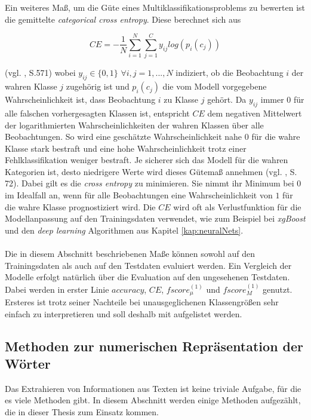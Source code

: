 \documentclass[a4paper,11pt]{article}
\begin{document}
Ein weiteres Maß, um die Güte eines Multiklassifikationsproblems zu bewerten ist die gemittelte \textit{categorical cross entropy}. Diese berechnet sich aus

\[ CE = - \frac{1}{N}\sum_{i=1}^N \sum_{j = 1}^C y_{ij} log(p_i(c_j)) \]

(vgl. \cite{murphy}, S.571) wobei $y_{ij} \in \{0,1\}$ \hspace{0.2cm} $\forall i, j = 1,...,N$ indiziert, ob die Beobachtung $i$ der wahren Klasse $j$ zugehörig ist und $p_i(c_j)$ die vom Modell vorgegebene Wahrscheinlichkeit ist, dass Beobachtung $i$ zu Klasse $j$ gehört. Da $y_{ij}$ immer $0$ für alle falschen vorhergesagten Klassen ist, entspricht $CE$ dem negativen Mittelwert der logarithmierten Wahrscheinlichkeiten der wahren Klassen über alle Beobachtungen. So wird eine geschätzte Wahrscheinlichkeit nahe $0$ für die wahre Klasse stark bestraft und eine hohe Wahrscheinlichkeit trotz einer Fehlklassifikation weniger bestraft. Je sicherer sich das Modell für die wahren Kategorien ist, desto niedrigere Werte wird dieses Gütemaß annehmen (vgl. \cite{proMachine}, S. 72). 
Dabei gilt es die \textit{cross entropy} zu minimieren. Sie nimmt ihr Minimum bei $0$ im Idealfall an, wenn für alle Beobachtungen eine Wahrscheinlichkeit von $1$ für die wahre Klasse prognostiziert wird. Die $CE$ wird oft als Verlustfunktion für die Modellanpassung auf den Trainingsdaten verwendet, wie zum Beispiel bei \textit{xgBoost} und den \textit{deep learning} Algorithmen aus Kapitel \ref{kap:neuralNets}.\\
\\
Die in diesem Abschnitt beschriebenen Maße können sowohl auf den Trainingsdaten als auch auf den Testdaten evaluiert werden. Ein Vergleich der Modelle erfolgt natürlich über die Evaluation auf den ungesehenen Testdaten. Dabei werden in erster Linie $accuracy$, $CE$, $fscore_\mu^{(1)}$ und $fscore_M^{(1)}$ genutzt. Ersteres ist trotz seiner Nachteile bei unausgeglichenen Klassengrößen sehr einfach zu interpretieren und soll deshalb mit aufgelistet werden.


\subsection{Methoden zur numerischen Repräsentation der Wörter} \label{kap:3.1Wordemb}

Das Extrahieren von Informationen aus Texten ist keine triviale Aufgabe, für die es viele Methoden gibt. In diesem Abschnitt werden einige Methoden aufgezählt, die in dieser Thesis zum Einsatz kommen.
\end{document}
